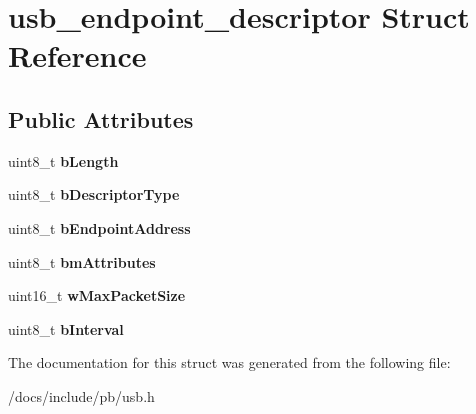\hypertarget{structusb__endpoint__descriptor}{}\section{usb\+\_\+endpoint\+\_\+descriptor Struct Reference}
\label{structusb__endpoint__descriptor}
\subsection*{Public Attributes}
\begin{DoxyCompactItemize}
\item 
\mbox{\label{structusb__endpoint__descriptor_aac9ff1940e27153339becfd460c5b796}} 
uint8\+\_\+t {\bfseries b\+Length}
\item 
\mbox{\label{structusb__endpoint__descriptor_aa6e24b3aa0c8130a4d39f2133ac5ed12}} 
uint8\+\_\+t {\bfseries b\+Descriptor\+Type}
\item 
\mbox{\label{structusb__endpoint__descriptor_a5007051761d339b5bb27268a016947a5}} 
uint8\+\_\+t {\bfseries b\+Endpoint\+Address}
\item 
\mbox{\label{structusb__endpoint__descriptor_a938a8fb34155743b6a68b64a79235538}} 
uint8\+\_\+t {\bfseries bm\+Attributes}
\item 
\mbox{\label{structusb__endpoint__descriptor_a0b665a4fbe5daf9ede7ae18d75e1c744}} 
uint16\+\_\+t {\bfseries w\+Max\+Packet\+Size}
\item 
\mbox{\label{structusb__endpoint__descriptor_a8fbc4ec9a4230f70729db036cfc07c44}} 
uint8\+\_\+t {\bfseries b\+Interval}
\end{DoxyCompactItemize}


The documentation for this struct was generated from the following file\+:\begin{DoxyCompactItemize}
\item 
/docs/include/pb/usb.\+h\end{DoxyCompactItemize}
